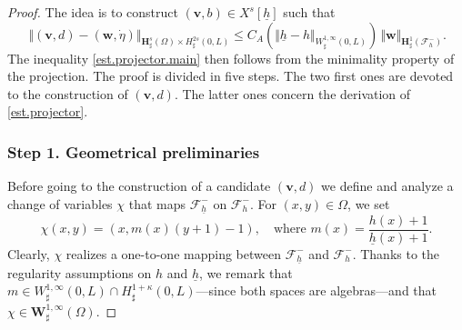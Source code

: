 \documentclass[11pt]{article}
\let\mathcal\mathscr
\theoremstyle{remark}
\theoremstyle{definition}
\newcommand{\norme}[1]{\,\Vert #1\Vert}
\newcommand{\vnorme}[1]{\Vert #1\Vert}
\newcommand{\vg}{\boldsymbol{v}}
\newcommand{\wg}{\boldsymbol{w}}
\newcommand{\BS}[1]{\boldsymbol{#1}}
\let\CM\Omega
\newcommand{\etap}{\dot{\eta}}
\newcommand{\hb}{{\underline{h}}}
\begin{document}
\begin{proof}
The idea is to construct $(\vg,b)\in X^{s}[\hb]$ such that
\begin{equation}\label{est.projector}
\norme{(\vg,d) -(\wg,\etap)}_{\BS{H}^{s}_{\sharp}(\CM)\times H^{2s}_{\sharp}(0,L)}\leq C_{A}(\vnorme{\hb -h }_{W^{1,\infty}_{\sharp}(0,L)})\norme{\wg}_{\BS{H}^{1}_{\sharp}(\mathcal{F}^{-}_{h})}.
\end{equation}
The inequality \eqref{est.projector.main} then follows from the minimality property of the projection.
The proof is divided in five steps. The two first ones are devoted to the construction of $(\vg,d)$. The latter ones
concern the derivation of \eqref{est.projector}.

\subsubsection*{Step 1. Geometrical preliminaries}
Before going to the construction of a candidate $(\vg,d)$ we define and analyze a change of variables
$\chi$ that maps $\mathcal{F}^-_{\hb}$ on $\mathcal{F}^-_{h}$. For $(x,y) \in \Omega$, we set
\[
\chi(x,y) = \left(x,m(x)(y+1)-1\right), \quad \text{where } m(x) = \frac{h(x)+1}{\hb(x)+1}.
\]
Clearly, $\chi$ realizes a one-to-one mapping between $\mathcal{F}^-_{\hb}$ and $\mathcal{F}^-_{h}$.
Thanks to the regularity assumptions on $h$ and $\hb$, we remark that $m\in W_\sharp^{1,\infty}(0, L)\cap H_\sharp^{1+\kappa}(0, L)$---since both spaces are algebras---and that $\chi \in \BS{W}_\sharp^{1, \infty}(\Omega)$.


\end{proof}
\end{document}
